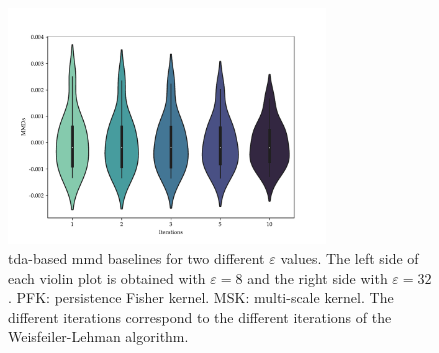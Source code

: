 \begin{figure}
  \centering
  \includegraphics[width=0.75\textwidth]{./figures/results/wl_baselines.pdf}
  \caption[Weisfeiler-Lehman-based \gls{mmd} baselines for two different
$\varepsilon$ values.]{\gls{tda}-based \gls{mmd} baselines for two
different $\varepsilon$ values. The left side of each violin plot is obtained
with $\varepsilon=8$ and the right side with $\varepsilon=32$. PFK: persistence
Fisher kernel. MSK: multi-scale kernel. The different iterations correspond to
the different iterations of the Weisfeiler-Lehman algorithm.}
\end{figure}
